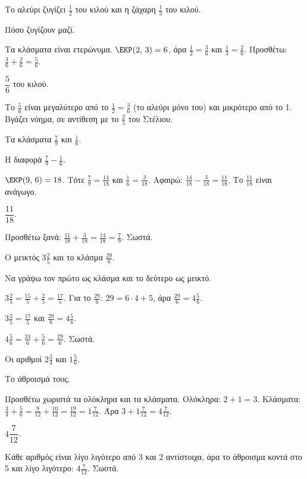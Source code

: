 
\tixero Το αλεύρι ζυγίζει $\frac{1}{2}$ του κιλού και η ζάχαρη $\frac{1}{3}$ του κιλού.\par
\tithelo Πόσο ζυγίζουν μαζί.\par
\possindeo Τα κλάσματα είναι ετερώνυμα. $\EKP(2,\,3)=6$, άρα $\frac{1}{2}=\frac{3}{6}$ και $\frac{1}{3}=\frac{2}{6}$. Προσθέτω: $\frac{3}{6}+\frac{2}{6}=\frac{5}{6}$.\par
\apantisi $\dfrac{5}{6}$ του κιλού.\par
\elegxos Το $\frac{5}{6}$ είναι μεγαλύτερο από το $\frac{1}{2}=\frac{3}{6}$ (το αλεύρι μόνο του) και μικρότερο από το 1. Βγάζει νόημα, σε αντίθεση με το $\frac{2}{5}$ του Στέλιου.

\tixero Τα κλάσματα $\frac{7}{9}$ και $\frac{1}{6}$.\par
\tithelo Η διαφορά $\frac{7}{9}-\frac{1}{6}$.\par
\possindeo $\EKP(9,\,6)=18$. Τότε $\frac{7}{9}=\frac{14}{18}$ και $\frac{1}{6}=\frac{3}{18}$. Αφαιρώ: $\frac{14}{18}-\frac{3}{18}=\frac{11}{18}$. Το $\frac{11}{18}$ είναι ανάγωγο.\par
\apantisi $\dfrac{11}{18}$.\par
\elegxos Προσθέτω ξανά: $\frac{11}{18}+\frac{3}{18}=\frac{14}{18}=\frac{7}{9}$. Σωστά.

\tixero Ο μεικτός $3\frac{2}{5}$ και το κλάσμα $\frac{29}{6}$.\par
\tithelo Να γράψω τον πρώτο ως κλάσμα και το δεύτερο ως μεικτό.\par
\possindeo $3\frac{2}{5}=\frac{15}{5}+\frac{2}{5}=\frac{17}{5}$. Για το $\frac{29}{6}$: $29=6\cdot 4+5$, άρα $\frac{29}{6}=4\frac{5}{6}$.\par
\apantisi $3\frac{2}{5}=\frac{17}{5}$ και $\frac{29}{6}=4\frac{5}{6}$.\par
\elegxos $4\frac{5}{6}=\frac{24}{6}+\frac{5}{6}=\frac{29}{6}$. Σωστά.

\tixero Οι αριθμοί $2\frac{3}{4}$ και $1\frac{5}{6}$.\par
\tithelo Το άθροισμά τους.\par
\possindeo Προσθέτω χωριστά τα ολόκληρα και τα κλάσματα. Ολόκληρα: $2+1=3$. Κλάσματα: $\frac{3}{4}+\frac{5}{6}=\frac{9}{12}+\frac{10}{12}=\frac{19}{12}=1\frac{7}{12}$. Άρα $3+1\frac{7}{12}=4\frac{7}{12}$.\par
\apantisi $4\dfrac{7}{12}$.\par
\elegxos Κάθε αριθμός είναι λίγο λιγότερο από 3 και 2 αντίστοιχα, άρα το άθροισμα κοντά στο 5 και λίγο λιγότερο: $4\frac{7}{12}$. Σωστά.

